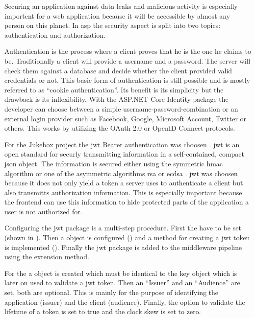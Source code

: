 Securing an application against data leaks and malicious activity is especially importent for a web application because it will be accessible by almost any person on this planet. In \gls{asp} the security aspect is split into two topics: authentication and authorization.


Authentication is the process where a client proves that he is the one he claims to be. Traditionally a client will provide a username and a password. The server will check them against a database and decide whether the client provided valid credentials or not. This basic form of authentication is still possible and is mostly referred to as \enquote{cookie authentication}. Its benefit is its simplicity but the drawback is its inflexibility. With the ASP.NET Core Identity package the developer can choose between a simple username-password-combination or an external login provider such as Facebook, Google, Microsoft Account, Twitter or others. This works by utilizing the OAuth 2.0 \cite{oauth2} or OpenID Connect \cite{openID} protocols.



For the Jukebox project the \gls{jwt} Bearer authentication was choosen \cite{jwt}. \gls{jwt} is an open standard for securly transmitting information in a self-contained, compact \gls{json} object. The information is secured either using the symmetric \gls{hmac} algorithm \cite{hmac} or one of the asymmetric algorithms \gls{rsa} or \gls{ecdsa} \cite{ecdsa}. \gls{jwt} was choosen because it does not only yield a token a server uses to authenticate a client but also transmitts authorization information. This is especially important because the frontend can use this information to hide protected parts of the application a user is not authorized for.

Configuring the \gls{jwt} package is a multi-step procedure. First the  have to be set (shown in ). Then a  object is configured () and a method for creating a \gls{jwt} token is implemented (). Finally the \gls{jwt} package is added to the middleware pipeline using the  extension method.

For the  a  object is created which must be identical to the key object which is later on used to validate a \gls{jwt} token. Then an \enquote{Issuer} and an \enquote{Audience} are set, both are optional. This is mainly for the purpose of identifying the application (issuer) and the client (audience). Finally, the option to validate the lifetime of a token is set to true and the clock skew is set to zero. \cite{jwtTokenAuth}

